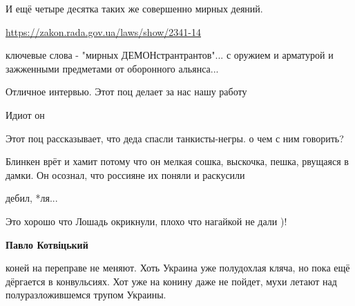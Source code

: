 \begin{itemize}
И ещё четыре десятка таких же совершенно мирных деяний.

\url{https://zakon.rada.gov.ua/laws/show/2341-14}

ключевые слова - "мирных ДЕМОНстрантрантов"... с оружием и арматурой и зажженными предметами от оборонного альянса...

Отличное интервью. Этот поц делает за нас нашу работу

Идиот он

Этот поц рассказывает, что деда спасли танкисты-негры. о чем с ним говорить?

Блинкен врёт и хамит потому что он мелкая сошка, выскочка, пешка, рвущаяся в дамки. Он осознал, что россияне их поняли и раскусили

дебил, *ля...

Это хорошо что Лошадь окрикнули, плохо что нагайкой не дали )!

\textbf{Павло Котвіцький} 

коней на переправе не меняют. Хоть Украина уже полудохлая кляча, но пока ещё
дёргается в конвульсиях. Хот уже на конину даже не пойдет, мухи летают над
полуразложившемся трупом Украины.

\end{itemize} %
